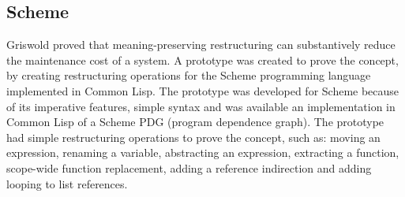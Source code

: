 






\subsection{Scheme}

Griswold \cite{griswold1991program} proved that meaning-preserving restructuring can substantively reduce the maintenance cost of a system.
A prototype was created to prove the concept, by creating restructuring operations for the Scheme programming language implemented in Common Lisp.
The prototype was developed for Scheme because of its imperative features, simple syntax and was available an implementation in Common Lisp of a Scheme PDG (program dependence graph).
The prototype had simple restructuring operations to prove the concept, such as: moving an expression, renaming a variable, abstracting an expression, extracting a function, scope-wide function replacement, adding a reference indirection and adding looping to list references.

